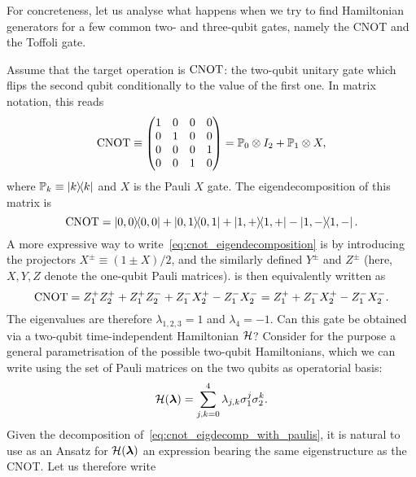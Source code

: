 For concreteness, let us analyse what happens when we try to find Hamiltonian generators for a few common two- and three-qubit gates, namely the CNOT and the Toffoli gate.
\begin{example}
\label{ex:eigendecomposition_cnot}
Assume that the target operation is $\operatorname{CNOT}$: the two-qubit unitary gate which flips the second qubit conditionally to the value of the first one.
In matrix notation, this reads
\begin{equation}
    \operatorname{CNOT} \equiv\begin{pmatrix}1&0&0&0 \\ 0&1&0&0 \\ 0&0&0&1\\0&0&1&0\end{pmatrix} =
    \mathbb{P}_0\otimes I_2 + \mathbb{P}_1\otimes X,
\end{equation}
where $\mathbb{P}_k\equiv\ketbra k$ and $X$ is the Pauli $X$ gate.
The eigendecomposition of this matrix is
\begin{equation}
    \operatorname{CNOT} =
    \ketbra{0,0} + \ketbra{0,1} + \ketbra{1,+} - \ketbra{1,-}.
    \label{eq:cnot_eigendecomposition}
\end{equation}
A more expressive way to write~\cref{eq:cnot_eigendecomposition} is by introducing the projectors $X^\pm\equiv(1\pm X)/2$, and the similarly defined $Y^\pm$ and $Z^\pm$ (here, $X,Y,Z$ denote the one-qubit Pauli matrices).
 is then equivalently written as
\begin{equation}
    \operatorname{CNOT} =
    Z^+_1 Z^+_2 + Z^+_1 Z^-_2
    + Z^-_1 X^+_2
    - Z^-_1 X^-_2
    = Z_1^+ + Z_1^- X_2^+ - Z_1^- X_2^-.
    \label{eq:cnot_eigdecomp_with_paulis}
\end{equation}
The eigenvalues are therefore $\lambda_{1,2,3}=1$ and $\lambda_4=-1$.
Can this gate be obtained via a two-qubit time-independent Hamiltonian $\mathcal{H}$?
Consider for the purpose a general parametrisation of the possible two-qubit Hamiltonians, which we can write using the set of Pauli matrices on the two qubits as operatorial basis:
\begin{equation}
    \mathcal{H}({\boldsymbol{\lambda}}) =
    \sum_{j,k=0}^4 \lambda_{j,k} \sigma^j_1\sigma^k_2.
\end{equation}
Given the decomposition of~\cref{eq:cnot_eigdecomp_with_paulis}, it is natural to use as an Ansatz for $\mathcal{H}(\boldsymbol{\lambda})$ an expression bearing the same eigenstructure as the CNOT. Let us therefore write
\begin{equation}

\end{equation}
\end{example}
